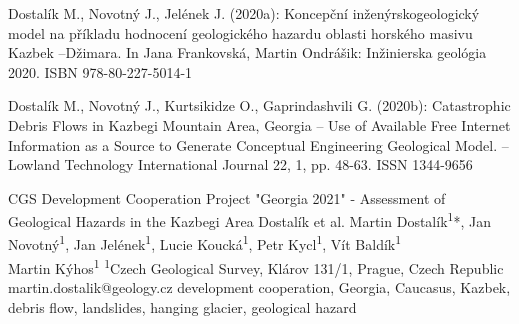 {Dostalík M., Novotný J., Jelének J. (2020a): Koncepční inženýrskogeologický model na příkladu hodnocení geologického hazardu oblasti horského masivu Kazbek –Džimara. In Jana Frankovská, Martin Ondrášik: Inžinierska geológia 2020. ISBN 978-80-227-5014-1

Dostalík M., Novotný J., Kurtsikidze O., Gaprindashvili G. (2020b): Catastrophic Debris Flows in Kazbegi Mountain Area, Georgia – Use of Available Free Internet Information as a Source to Generate Conceptual Engineering Geological Model. – Lowland Technology International Journal 22, 1, pp. 48-63. ISSN 1344-9656
}


\abstract
{CGS Development Cooperation Project "Georgia 2021" - Assessment of Geological Hazards in the Kazbegi Area} 
{Dostalík et al.} 
{Martin Dostalík\textsuperscript{1}*, Jan Novotný\textsuperscript{1}, Jan Jelének\textsuperscript{1}, Lucie Koucká\textsuperscript{1}, Petr Kycl\textsuperscript{1}, Vít Baldík\textsuperscript{1}\\ Martin Kýhos\textsuperscript{1}} 
{\POtag} 
{
\textsuperscript{1}Czech Geological Survey, Klárov 131/1, Prague, Czech Republic
}
{martin.dostalik@geology.cz}  %
{development cooperation, Georgia, Caucasus, Kazbek, debris flow, landslides, hanging glacier, geological hazard}

